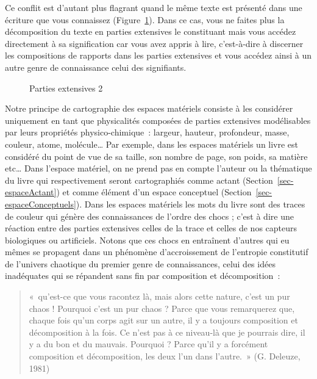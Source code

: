 \documentclass[
  a4paper,
  DIV=11,
  numbers=noendperiod]{scrreprt}
\begin{document}
Ce conflit est d'autant plus flagrant quand le même texte est présenté
dans une écriture que vous connaissez (Figure~\ref{fig-partExt2}). Dans
ce cas, vous ne faites plus la décomposition du texte en parties
extensives le constituant mais vous accédez directement à sa
signification car vous avez appris à lire, c'est-à-dire à discerner les
compositions de rapports dans les parties extensives et vous accédez
ainsi à un autre genre de connaissance celui des signifiants.

\begin{figure}


\caption{\label{fig-partExt2}Parties extensives 2}

\end{figure}%

Notre principe de cartographie des espaces matériels consiste à les
considérer uniquement en tant que physicalités composées de parties
extensives modélisables par leurs propriétés physico-chimique~: largeur,
hauteur, profondeur, masse, couleur, atome, molécule\ldots{} Par
exemple, dans les espaces matériels un livre est considéré du point de
vue de sa taille, son nombre de page, son poids, sa matière etc\ldots{}
Dans l'espace matériel, on ne prend pas en compte l'auteur ou la
thématique du livre qui respectivement seront cartographiés comme actant
(Section~\ref{sec-espaceActant}) et comme élément d'un espace conceptuel
(Section~\ref{sec-espaceConceptuels}). Dans les espaces matériels les
mots du livre sont des traces de couleur qui génère des connaissances de
l'ordre des chocs ; c'est à dire une réaction entre des parties
extensives celles de la trace et celles de nos capteurs biologiques ou
artificiels. Notons que ces chocs en entraînent d'autres qui eu mêmes se
propagent dans un phénomène d'accroissement de l'entropie constitutif de
l'univers chaotique du premier genre de connaissances, celui des idées
inadéquates qui se répandent sans fin par composition et décomposition~:

\begin{quote}
«~qu'est-ce que vous racontez là, mais alors cette nature, c'est un pur
chaos ! Pourquoi c'est un pur chaos ? Parce que vous remarquerez que,
chaque fois qu'un corps agit sur un autre, il y a toujours composition
et décomposition à la fois. Ce n'est pas à ce niveau-là que je pourrais
dire, il y a du bon et du mauvais. Pourquoi ? Parce qu'il y a forcément
composition et décomposition, les deux l'un dans l'autre.~» (G. Deleuze,
1981)
\end{quote}
\end{document}
